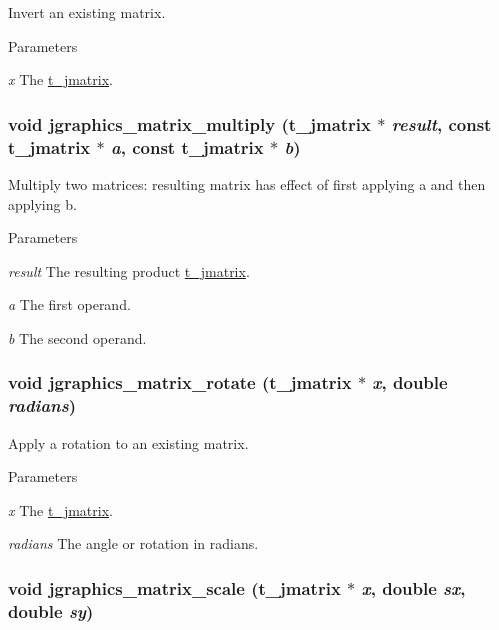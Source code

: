 Invert an existing matrix. 
\begin{DoxyParams}{Parameters}
\item[{\em x}]The \hyperlink{structt__jmatrix}{t\_\-jmatrix}. \end{DoxyParams}
\hypertarget{group__jmatrix_ga496e878760928eaa1226a3ddf7e265a7}{
\subsubsection[{jgraphics\_\-matrix\_\-multiply}]{\setlength{\rightskip}{0pt plus 5cm}void jgraphics\_\-matrix\_\-multiply ({\bf t\_\-jmatrix} $\ast$ {\em result}, \/  const {\bf t\_\-jmatrix} $\ast$ {\em a}, \/  const {\bf t\_\-jmatrix} $\ast$ {\em b})}}
\label{group__jmatrix_ga496e878760928eaa1226a3ddf7e265a7}


Multiply two matrices: resulting matrix has effect of first applying a and then applying b. 
\begin{DoxyParams}{Parameters}
\item[{\em result}]The resulting product \hyperlink{structt__jmatrix}{t\_\-jmatrix}. \item[{\em a}]The first operand. \item[{\em b}]The second operand. \end{DoxyParams}
\hypertarget{group__jmatrix_gabbe882c283d57b37da55cd4d069b55dc}{
\subsubsection[{jgraphics\_\-matrix\_\-rotate}]{\setlength{\rightskip}{0pt plus 5cm}void jgraphics\_\-matrix\_\-rotate ({\bf t\_\-jmatrix} $\ast$ {\em x}, \/  double {\em radians})}}
\label{group__jmatrix_gabbe882c283d57b37da55cd4d069b55dc}


Apply a rotation to an existing matrix. 
\begin{DoxyParams}{Parameters}
\item[{\em x}]The \hyperlink{structt__jmatrix}{t\_\-jmatrix}. \item[{\em radians}]The angle or rotation in radians. \end{DoxyParams}
\hypertarget{group__jmatrix_gaac1ee9b0dc5e54cc0cb8e5a213df1b51}{
\subsubsection[{jgraphics\_\-matrix\_\-scale}]{\setlength{\rightskip}{0pt plus 5cm}void jgraphics\_\-matrix\_\-scale ({\bf t\_\-jmatrix} $\ast$ {\em x}, \/  double {\em sx}, \/  double {\em sy})}}
\label{group__jmatrix_gaac1ee9b0dc5e54cc0cb8e5a213df1b51}


